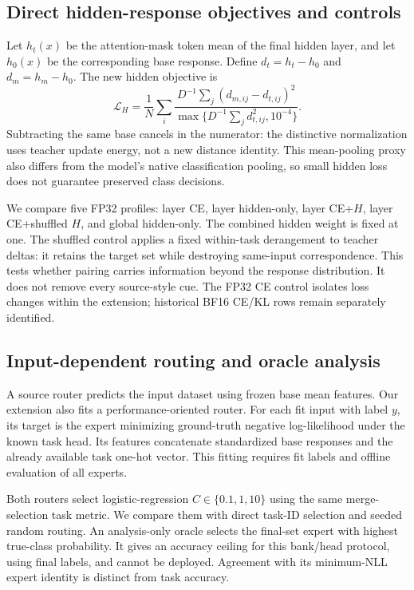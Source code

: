 \documentclass[11pt,a4paper]{article}
\begin{document}
\subsection{Direct hidden-response objectives and controls}
Let $h_t(x)$ be the attention-mask token mean of the final hidden layer, and let $h_0(x)$ be the corresponding base response. Define $d_t=h_t-h_0$ and $d_m=h_m-h_0$. The new hidden objective is
\begin{equation}
 \mathcal L_H=\frac{1}{N}\sum_i
 \frac{D^{-1}\sum_j(d_{m,ij}-d_{t,ij})^2}
 {\max\{D^{-1}\sum_j d_{t,ij}^2,10^{-4}\}}.
\end{equation}
Subtracting the same base cancels in the numerator: the distinctive normalization uses teacher update energy, not a new distance identity. This mean-pooling proxy also differs from the model's native classification pooling, so small hidden loss does not guarantee preserved class decisions.

We compare five FP32 profiles: layer CE, layer hidden-only, layer CE+$H$, layer CE+shuffled $H$, and global hidden-only. The combined hidden weight is fixed at one. The shuffled control applies a fixed within-task derangement to teacher deltas: it retains the target set while destroying same-input correspondence. This tests whether pairing carries information beyond the response distribution. It does not remove every source-style cue. The FP32 CE control isolates loss changes within the extension; historical BF16 CE/KL rows remain separately identified.

\subsection{Input-dependent routing and oracle analysis}
A source router predicts the input dataset using frozen base mean features. Our extension also fits a performance-oriented router. For each fit input with label $y$, its target is the expert minimizing ground-truth negative log-likelihood under the known task head. Its features concatenate standardized base responses and the already available task one-hot vector. This fitting requires fit labels and offline evaluation of all experts.

Both routers select logistic-regression $C\in\{0.1,1,10\}$ using the same merge-selection task metric. We compare them with direct task-ID selection and seeded random routing. An analysis-only oracle selects the final-set expert with highest true-class probability. It gives an accuracy ceiling for this bank/head protocol, using final labels, and cannot be deployed. Agreement with its minimum-NLL expert identity is distinct from task accuracy.
\end{document}
